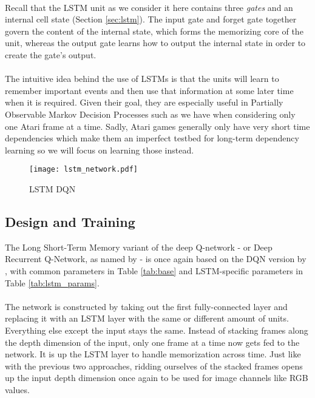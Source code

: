 \paragraph{}
Recall that the LSTM unit as we consider it here
contains three \textit{gates}
and an internal cell state (Section \ref{sec:lstm}).
The input gate and forget gate together govern
the content of the internal state,
which forms the memorizing core of the unit,
whereas the output gate
learns how to output the internal state
in order to create the gate's output.

\paragraph{}
The intuitive idea behind the use of LSTMs
is that the units will learn to remember important events
and then use that information at some later time
when it is required.
Given their goal,
they are especially useful in Partially Observable Markov Decision Processes
such as we have when considering only one Atari frame at a time.
Sadly, Atari games generally only have very short time dependencies
which make them an imperfect testbed for
long-term dependency learning
so we will focus on learning those instead.

\begin{figure}[htpb]
  \centering
  \texttt{[image: lstm\_network.pdf]}
  \caption[LSTM DQN]{LSTM DQN}
  \label{fig:lstm_network}
\end{figure}

\subsection{Design and Training}
\label{sub:lstm_design_and_training}
The Long Short-Term Memory variant
of the deep Q-network
- or Deep Recurrent Q-Network,
as named by \cite{Hausknecht2015} -
is once again based on the DQN version
by \cite{Mnih2013},
with common parameters in Table \ref{tab:base}
and LSTM-specific parameters in Table \ref{tab:lstm_params}.

\paragraph{}
The network is constructed by taking out
the first fully-connected layer
and replacing it with an LSTM layer
with the same or different amount of units.
Everything else except the input stays the same.
Instead of stacking frames along the depth dimension of the input,
only one frame at a time now gets fed to the network.
It is up the LSTM layer to handle memorization across time.
Just like with the previous two approaches,
ridding ourselves of the stacked frames opens up the input depth dimension
once again
to be used for image channels like RGB values.

